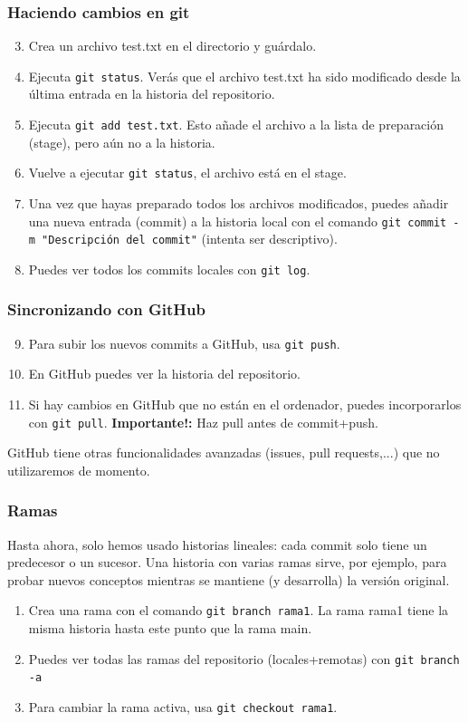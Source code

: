 \documentclass[mathserif, 10pt]{beamer}
\begin{document}
\begin{frame}\frametitle{Haciendo cambios en git}
\begin{enumerate}\setcounter{enumi}{2}
\item Crea un archivo test.txt en el directorio y guárdalo.
\item Ejecuta \texttt{git status}. Verás que el archivo test.txt ha sido modificado desde la última entrada en la historia del repositorio.
\item Ejecuta \texttt{git add test.txt}. Esto añade el archivo a la lista de preparación (stage), pero aún no a la historia.
\item Vuelve a ejecutar \texttt{git status}, el archivo está en el stage.
\item Una vez que hayas preparado todos los archivos modificados, puedes añadir una nueva entrada (commit) a la historia local con el comando \texttt{git commit -m "Descripción del commit"} (intenta ser descriptivo).
\item Puedes ver todos los commits locales con \texttt{git log}.
\end{enumerate}
    

\end{frame}

\begin{frame}\frametitle{Sincronizando con GitHub}
    \begin{enumerate}\setcounter{enumi}{8}
        \item Para subir los nuevos commits a GitHub, usa \texttt{git push}.
        \item En GitHub puedes ver la historia del repositorio.
        \item Si hay cambios en GitHub que no están en el ordenador, puedes incorporarlos con \texttt{git pull}. \textbf{Importante!:} Haz pull antes de commit+push.
    \end{enumerate}

    GitHub tiene otras funcionalidades avanzadas (issues, pull requests,...) que no utilizaremos de momento.

\end{frame}

\begin{frame}\frametitle{Ramas}
    Hasta ahora, solo hemos usado historias lineales: cada commit solo tiene un predecesor o un sucesor. Una historia con varias ramas sirve, por ejemplo, para probar nuevos conceptos mientras se mantiene (y desarrolla) la versión original.

    \begin{enumerate}
        \item Crea una rama con el comando \texttt{git branch rama1}. La rama rama1 tiene la misma historia hasta este punto que la rama main.
        \item Puedes ver todas las ramas del repositorio (locales+remotas) con \texttt{git branch -a}
        \item Para cambiar la rama activa, usa \texttt{git checkout rama1}.
    \end{enumerate}
\end{frame}
\end{document}
